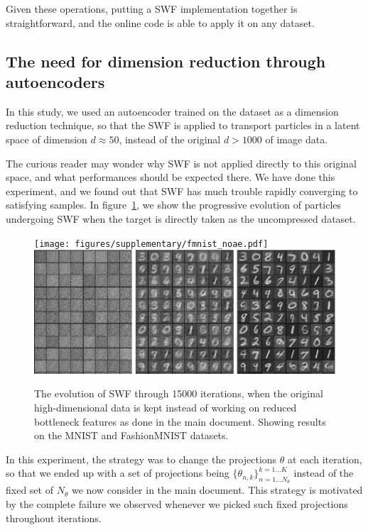 Given these operations, putting a SWF implementation together is straightforward, and the online code is able to apply it on any dataset.

\subsection{The need for dimension reduction through autoencoders}

In this study, we used an autoencoder trained on the dataset as a dimension reduction technique, so that the SWF is applied to transport particles in a latent space of dimension $d\approx 50$, instead of the original $d>1000$ of image data.

The curious reader may wonder why SWF is not applied directly to this original space, and what performances should be expected there. We have done this experiment, and we found out that SWF has much trouble rapidly converging to satisfying samples. In figure~\ref{fig:suppnoae}, we show the progressive evolution of particles undergoing SWF when the target is directly taken as the uncompressed dataset.

\begin{figure}
\centering
\texttt{[image: figures/supplementary/fmnist\_noae.pdf]}
\includegraphics[width=\columnwidth]{figures/supplementary/mnist_noae.pdf}
\caption{The evolution of SWF through 15000 iterations, when the original high-dimensional data is kept instead of working on reduced bottleneck features as done in the main document. Showing results on the MNIST and FashionMNIST datasets.}
\label{fig:suppnoae}
\end{figure}

In this experiment, the strategy was to change the projections $\theta$ at each iteration, so that we ended up with a set of projections being $\{\theta_{n,k}\}_{n=1\dots N_\theta}^{k=1\dots K}$ instead of the fixed set of $N_\theta$ we now consider in the main document. This strategy is motivated by the complete failure we observed whenever we picked such fixed projections throughout iterations.

